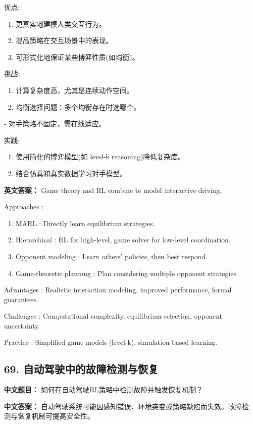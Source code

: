 \documentclass[10pt,a4paper]{ctexart}
\begin{document}
 优点:
\begin{enumerate}
    \item 更真实地建模人类交互行为。
    \item 提高策略在交互场景中的表现。
    \item 可形式化地保证某些博弈性质(如均衡)。
\end{enumerate}

 挑战:
\begin{enumerate}
    \item 计算复杂度高，尤其是连续动作空间。
    \item 均衡选择问题：多个均衡存在时选哪个。
\end{enumerate}
- 对手策略不固定，需在线适应。

 实践:
\begin{enumerate}
    \item 使用简化的博弈模型(如 level-k reasoning)降低复杂度。
    \item 结合仿真和真实数据学习对手模型。
\end{enumerate}

\textbf{英文答案：}  
Game theory and RL combine to model interactive driving.

 Approaches :
\begin{enumerate}
    \item MARL : Directly learn equilibrium strategies.
    \item Hierarchical : RL for high-level, game solver for low-level coordination.
    \item Opponent modeling : Learn others' policies, then best respond.
    \item Game-theoretic planning : Plan considering multiple opponent strategies.
\end{enumerate}

 Advantages : Realistic interaction modeling, improved performance, formal guarantees.

 Challenges : Computational complexity, equilibrium selection, opponent uncertainty.

 Practice : Simplified game models (level-k), simulation-based learning.

\subsection*{69. 自动驾驶中的故障检测与恢复}
\textbf{中文题目：} 如何在自动驾驶RL策略中检测故障并触发恢复机制？

\textbf{中文答案：}  
自动驾驶系统可能因感知错误、环境突变或策略缺陷而失效。故障检测与恢复机制可提高安全性。
\end{document}
